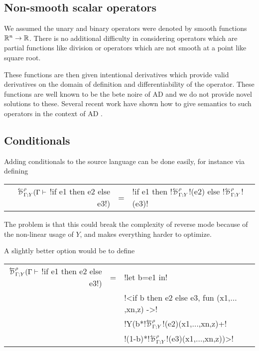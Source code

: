 \subsection{Non-smooth scalar operators} %
\label{sub:Adding more scalar operators}

We assumed the unary and binary operators were denoted by smooth functions $\mathbb{R}^n\to\mathbb{R}$. 
There is no additional difficulty in considering operators which are partial functions 
like division or operators which are not smooth at a point like square root.

These functions are then given intentional derivatives which provide valid derivatives 
on the domain of definition and differentiability of the operator. 
These functions are well known to be the bete noire of AD \cite{griewank2008evaluating} 
and we do not provide novel solutions to these.  
Several recent work have shown how to give semantics to such operators in the context of AD \cite{vakar2020denotational,mazza2021automatic,sherman2021,lee2020correctness}.

\subsection{Conditionals} %
\label{sub:Adding conditionals}

Adding conditionals to the source language can be done easily, for instance via defining

\begin{tabular}{r c l}
$\directD{\rho}{\Gamma}{Y}(\Gamma \vdash$ !if e1 then e2 else e3!) &=& !if e1 then !$\directD{\rho}{\Gamma}{Y}$!(e2) else !$\directD{\rho}{\Gamma}{Y}$!(e3)! 
\end{tabular}

The problem is that this could break the complexity of reverse mode because of the non-linear usage of $Y$, and makes everything harder to optimize.

A slightly better option would be to define 

\begin{tabular}{r c l}
    $\directD{\rho}{\Gamma}{Y}(\Gamma \vdash$ !if e1 then e2 else e3!) 
    &=& !let b=e1 in!   \\
    && !<if b then e2 else e3, fun (x1,$\ldots$,xn,z) ->! \\
    && !Y(b*!$\directD{\rho}{\Gamma}{Y}$!(e2)(x1,$\ldots$,xn,z)+!\\
    && \quad!(1-b)*!$\directD{\rho}{\Gamma}{Y}$!(e3)(x1,$\ldots$,xn,z))>!
\end{tabular}

